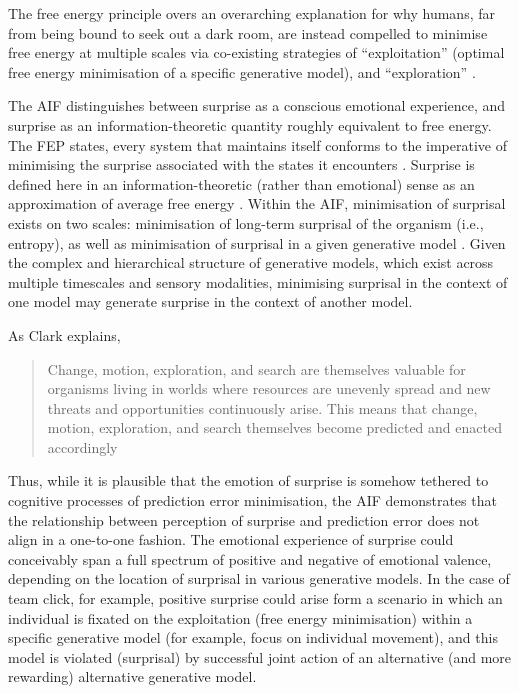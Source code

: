\begin{CJK}{UTF8}{gbsn}
The free energy principle overs an overarching explanation for why humans, far from being bound to seek out a dark room, are instead compelled to minimise free energy at multiple scales via co-existing strategies of ``exploitation'' (optimal free energy minimisation of a specific generative model), and ``exploration'' \citep[optimal free energy reduction of surprisal on broader scales, i.e., in the context of other generative models or the life of the organism more generally; see][]{Cohen2007}.

The AIF distinguishes between surprise as a conscious emotional experience, and surprise as an information-theoretic quantity roughly equivalent to free energy.  The FEP states, every system that maintains itself conforms to the imperative of minimising the surprise associated with the states it encounters \citep{Friston2012a}.  Surprise is defined here in an information-theoretic (rather than emotional) sense as an approximation of average free energy \citep[in fact, Tribus distinguished information-theoretic ``surprisal'' from surprise in an active attempt to separate the two concepts see][]{Tribus1961}.  Within the AIF, minimisation of surprisal exists on two scales: minimisation of long-term surprisal of the organism (i.e., entropy), as well as minimisation of surprisal in a given generative model \citep[i.e., free energy, see][2]{Schwartenbeck2013}. Given the complex and hierarchical structure of generative models, which exist across multiple timescales and sensory modalities,  minimising surprisal in the context of one model may generate surprise in the context of another model.

As Clark explains,

      \begin{quote}
        Change, motion, exploration, and search are themselves valuable for organisms living in worlds where resources are unevenly spread and new threats and opportunities continuously arise.  This means that change, motion, exploration, and search themselves become predicted and enacted accordingly \citep[193]{Clark2013}
      \end{quote}

Thus, while it is plausible that the emotion of surprise is somehow tethered to cognitive processes of prediction error minimisation, the AIF demonstrates that the relationship between perception of surprise and prediction error does not align in a one-to-one fashion. The emotional experience of surprise could conceivably span a full spectrum of positive and negative of emotional valence, depending on the location of surprisal in various generative models. In the case of team click, for example, positive surprise could arise form a scenario in which an individual is fixated on the exploitation (free energy minimisation) within a specific generative model (for example, focus on individual movement), and this model is violated (surprisal) by successful joint action of an alternative (and more rewarding) alternative generative model.


\end{CJK}
